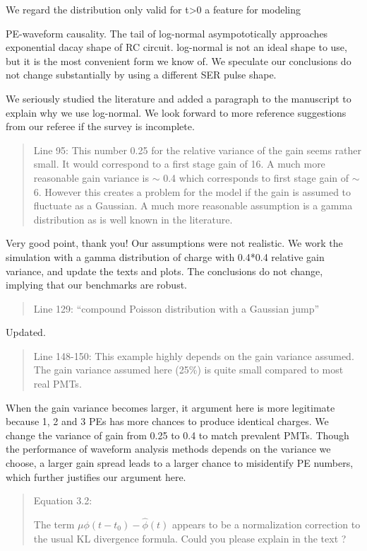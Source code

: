 \documentclass[12pt]{article}
\begin{document}
We regard the distribution only valid for t>0 a feature for modeling

PE-waveform causality.  The tail of log-normal asympototically approaches exponential dacay shape of RC circuit. log-normal is not an ideal shape to use, but it is the most convenient form we know of.  We speculate our conclusions do not change substantially by using a different SER pulse shape.

We seriously studied the literature and added a paragraph to the manuscript to explain why we use log-normal.  We look forward to more reference suggestions from our referee if the survey is incomplete.

\begin{quote}
Line 95: This number 0.25 for the relative variance of the gain seems rather small. It would correspond to a first stage gain of 16. A much more reasonable gain variance is $\sim$ 0.4 which corresponds to first stage gain of $\sim$ 6. However this creates a problem for the model if the gain is assumed to fluctuate as a Gaussian. A much more reasonable assumption is a gamma distribution as is well known in the literature.
\end{quote}

Very good point, thank you!  Our assumptions were not realistic.  We work the simulation with a gamma distribution of charge with 0.4*0.4 relative gain variance, and update the texts and plots.  The conclusions do not change, implying that our benchmarks are robust. 

\begin{quote}
Line 129: ``compound Poisson distribution with a Gaussian jump''
\end{quote}

Updated.

\begin{quote}
Line 148-150: This example highly depends on the gain variance assumed. The gain variance assumed here (25\%) is quite small compared to most real PMTs.
\end{quote}

When the gain variance becomes larger, it argument here is more legitimate because 1, 2 and 3 PEs has more chances to produce identical charges. We change the variance of gain from 0.25 to 0.4 to match prevalent PMTs. Though the performance of waveform analysis methods depends on the variance we choose, a larger gain spread leads to a larger chance to misidentify PE numbers, which further justifies our argument here.

\begin{quote}
Equation 3.2:

The term $\mu\phi(t-t_0)-\hat{\phi}(t)$ appears to be a normalization correction to the usual KL divergence formula. Could you please explain in the text ?
\end{quote}
\end{document}

